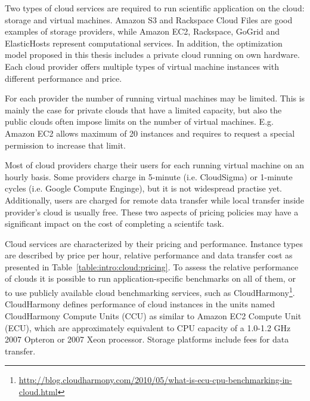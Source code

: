 Two  types of cloud services are required to run scientific application on the cloud: storage and virtual machines. Amazon S3 and Rackspace Cloud Files are good examples of storage providers, while Amazon EC2, Rackspace, GoGrid and ElasticHosts represent computational services. In addition, the optimization model proposed in this thesis includes a private cloud running on own hardware. Each cloud provider offers multiple types of virtual machine instances with different performance and price.

For each provider the number of running virtual machines may be limited.  This is mainly the case for private clouds that have a limited capacity, but also the public clouds often impose limits on the number of virtual machines. E.g. Amazon EC2 allows maximum of 20 instances and requires to request a special permission to increase that limit. 

Most of cloud providers charge their users for each running virtual machine on an hourly basis. Some providers charge in 5-minute (i.e. CloudSigma) or 1-minute cycles (i.e. Google Compute Enginge), but it is not widespread practise yet. Additionally, users are charged for remote data transfer while local transfer inside provider's cloud is usually free. These two aspects of pricing policies may have a significant impact on the cost of completing a scientifc task.

Cloud services are characterized by their pricing and performance. Instance types are described by price per hour, relative performance and data transfer cost as presented in Table~\ref{table:intro:cloud:pricing}. To assess the relative performance of clouds it is possible to run application-specific benchmarks on all of them, or to use publicly available cloud benchmarking services, such as CloudHarmony\footnote{\url{http://blog.cloudharmony.com/2010/05/what-is-ecu-cpu-benchmarking-in-cloud.html}}. CloudHarmony defines performance of cloud instances in the units named CloudHarmony Compute Units (CCU) as similar to Amazon EC2 Compute Unit (ECU), which are approximately equivalent to CPU capacity of a 1.0-1.2 GHz 2007 Opteron or 2007 Xeon processor. Storage platforms include fees for data transfer.


